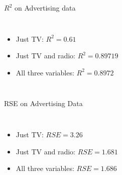 \documentclass[aspectratio=169,usenames,dvipsnames]{beamer}
\newcommand{\InstructorList}[1]{
\begin{itemize}
	\color{orange}
	#1
\end{itemize}
}
\renewcommand{\InstructorList}[1]{}
\begin{document}
\begin{frame}[c]{$R^2$ on Advertising data}

\begin{columns}
\centering
\begin{itemize}
	\item Just TV: $R^2 = 0.61$
	\item Just TV and radio: $R^2 = 0.89719$
	\item All three variables: $R^2 = 0.8972$
\end{itemize}

\centering
\InstructorList{
\item $R^2$ always increases with more variables, even if those variables are weakly associated to the response
\item Adding another variable decreases RSS on training
\item Small increase in $R^2$ if we include newspaper to other two, so can safely ignore
\item Large increase going from just TV to TV and Radio, so likely want to keep that
}
\end{columns}

\end{frame}
\begin{frame}[c]{RSE on Advertising Data}

\begin{columns}
\centering
\centering
\begin{itemize}
	\item Just TV: $RSE = 3.26$
	\item Just TV and radio: $RSE = 1.681$
	\item All three variables: $RSE = 1.686$
\end{itemize}
\centering
\InstructorList{
\item Similar argument about big jump from TV to TV and radio, but small difference after that
\item Even though RSS went down, RSE goes up at the end because increase in $p$ made a difference in the fraction $RSE = \sqrt{\frac{RSS}{n- p - 1}}$
}
\end{columns}

\end{frame}
\end{document}

